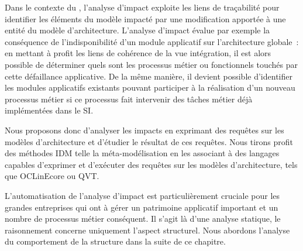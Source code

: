 Dans le contexte du , l'analyse d'impact exploite les
liens de traçabilité pour identifier les éléments du modèle impacté par une modification 
apportée à une entité du modèle d'architecture.
L'analyse d'impact évalue par exemple la conséquence de l'indisponibilité d'un module applicatif sur l'architecture
globale~: en mettant à profit les liens de cohérence de la vue intégration, il
est alors possible de déterminer quels sont les processus métier ou
fonctionnels touchés par cette défaillance applicative. De la même manière, il devient
possible d'identifier les modules applicatifs existants pouvant participer à la
réalisation d'un nouveau processus métier si ce processus fait intervenir des tâches
métier déjà implémentées dans le SI.

Nous proposons donc d'analyser les impacts en exprimant des requêtes sur les modèles
d'architecture et d'étudier le résultat de ces requêtes. Nous tirons profit des méthodes IDM telle la méta-modélisation en les
associant à des langages capables d'exprimer et d'exécuter des requêtes sur les modèles d'architecture,
tels que OCLinEcore ou QVT.


L'automatisation de l'analyse d'impact est particulièrement cruciale pour les grandes entreprises qui ont à gérer
un patrimoine applicatif important et un nombre de processus métier conséquent.
Il s'agit là d'une analyse statique, le raisonnement concerne uniquement l'aspect structurel. Nous abordons l'analyse
du comportement de la structure dans la suite de ce chapitre.









